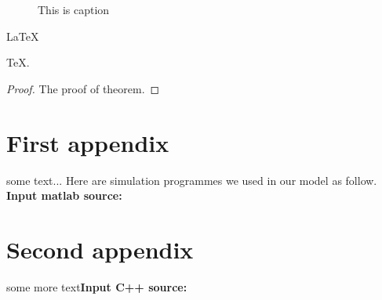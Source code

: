 \begin{figure}[h]
  \small
  \centering
  \caption{This is caption}
  \label{fig:one_figure}
\end{figure}

\begin{Theorem} \label{thm:latex}
    \LaTeX
\end{Theorem}
\begin{Lemma} \label{thm:tex}
    \TeX .
\end{Lemma}
\begin{proof}
    The proof of theorem.
\end{proof}

\begin{appendices}
\section{First appendix}
some text...
Here are simulation programmes we used in our model as follow.\\
\textbf{\textcolor[rgb]{0.98,0.00,0.00}{Input matlab source:}}



\section{Second appendix}
some more text\textcolor[rgb]{0.98,0.00,0.00}{\textbf{Input C++ source:}}


\end{appendices}
